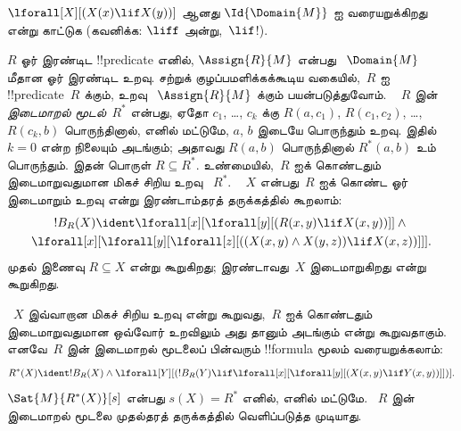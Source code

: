 \documentclass[../../../include/open-logic-section]{subfiles}
\begin{document}
\begin{prob}
$\lforall[X][(X(x) \lif X(y))]$ ஆனது $\Id{\Domain{M}}$ ஐ
வரையறுக்கிறது என்று காட்டுக (கவனிக்க: $\liff$ அன்று,~$\lif$!).
\end{prob}

\begin{ex}
$R$ ஓர் இரண்டிட !!{predicate} எனில், $\Assign{R}{M}$ என்பது
~$\Domain{M}$ மீதான ஓர் இரண்டிட உறவு. சற்றுக் குழப்பமளிக்கக்கூடிய
வகையில்,~$R$ ஐ !!{predicate}~$R$ க்கும், உறவு
~$\Assign{R}{M}$ க்கும் பயன்படுத்துவோம். ~ $R$ இன்
\emph{இடைமாறல் மூடல்}~$R^*$ என்பது, ஏதோ $c_1$, \dots, $c_k$
க்கு $R(a,c_1)$, $R(c_1, c_2)$, \dots, $R(c_k,b)$ பொருந்தினால்,
எனில் மட்டுமே, $a$, $b$ இடையே பொருந்தும் உறவு. இதில் $k = 0$
என்ற நிலையும் அடங்கும்; அதாவது $R(a,b)$ பொருந்தினால்
$R^*(a,b)$ உம் பொருந்தும். இதன் பொருள் $R \subseteq R^*$.
உண்மையில்,~$R$ ஐக் கொண்டதும் இடைமாறுவதுமான மிகச் சிறிய உறவு
~$R^*$. ~ $X$ என்பது~$R$ ஐக் கொண்ட ஓர் இடைமாறும் உறவு என்று
இரண்டாம்தரத் தருக்கத்தில் கூறலாம்:
\begin{multline*}
  !B_R(X) \ident \lforall[x][\lforall[y][(R(x,y) \lif X(x, y))]] \land {}\\
\lforall[x][\lforall[y][\lforall[z][((X(x,y) \land X(y,z)) \lif X(x,
      z))]]].
\end{multline*}
முதல் இணைவு $R \subseteq X$ என்று கூறுகிறது; இரண்டாவது~$X$
இடைமாறுகிறது என்று கூறுகிறது.

~$X$ இவ்வாறான மிகச் சிறிய உறவு என்று கூறுவது,~$R$ ஐக் கொண்டதும்
இடைமாறுவதுமான ஒவ்வோர் உறவிலும் அது தானும் அடங்கும் என்று கூறுவதாகும்.
எனவே~$R$ இன் இடைமாறல் மூடலைப் பின்வரும் !!{formula} மூலம்
வரையறுக்கலாம்:
\[
R^*(X) \ident !B_R(X) \land \lforall[Y][(!B_R(Y) \lif
  \lforall[x][\lforall[y][(X(x, y) \lif Y(x,y))]])].
\]
$\Sat{M}{R^*(X)}[s]$ என்பது $s(X) = R^*$ எனில், எனில் மட்டுமே.
~$R$ இன் இடைமாறல் மூடலை முதல்தரத் தருக்கத்தில் வெளிப்படுத்த
முடியாது.
\end{ex}
\end{document}
